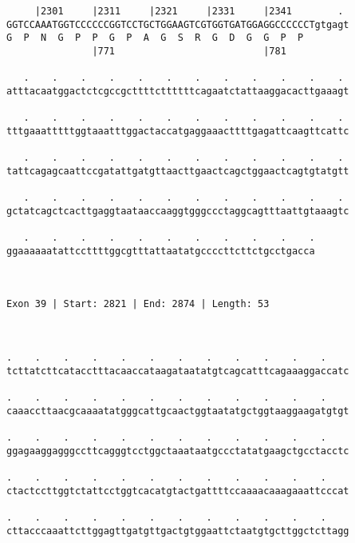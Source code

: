\documentclass{article}
\begin{document}
\begin{Verbatim}
     |2301     |2311     |2321     |2331     |2341        . 
GGTCCAAATGGTCCCCCCGGTCCTGCTGGAAGTCGTGGTGATGGAGGCCCCCCTgtgagt
G  P  N  G  P  P  G  P  A  G  S  R  G  D  G  G  P  P        
               |771                          |781           
  
   .    .    .    .    .    .    .    .    .    .    .    . 
atttacaatggactctcgccgcttttcttttttcagaatctattaaggacacttgaaagt
                                                            
   .    .    .    .    .    .    .    .    .    .    .    . 
tttgaaatttttggtaaatttggactaccatgaggaaacttttgagattcaagttcattc
                                                            
   .    .    .    .    .    .    .    .    .    .    .    . 
tattcagagcaattccgatattgatgttaacttgaactcagctggaactcagtgtatgtt
                                                            
   .    .    .    .    .    .    .    .    .    .    .    . 
gctatcagctcacttgaggtaataaccaaggtgggccctaggcagtttaattgtaaagtc
                                                            
   .    .    .    .    .    .    .    .    .    .    .
ggaaaaaatattccttttggcgtttattaatatgccccttcttctgcctgacca
                                                      
                                                      
 
Exon 39 | Start: 2821 | End: 2874 | Length: 53



.    .    .    .    .    .    .    .    .    .    .    .    
tcttatcttcatacctttacaaccataagataatatgtcagcatttcagaaaggaccatc
                                                            
.    .    .    .    .    .    .    .    .    .    .    .    
caaaccttaacgcaaaatatgggcattgcaactggtaatatgctggtaaggaagatgtgt
                                                            
.    .    .    .    .    .    .    .    .    .    .    .    
ggagaaggagggccttcagggtcctggctaaataatgccctatatgaagctgcctacctc
                                                            
.    .    .    .    .    .    .    .    .    .    .    .    
ctactccttggtctattcctggtcacatgtactgattttccaaaacaaagaaattcccat
                                                            
.    .    .    .    .    .    .    .    .    .    .    .    
cttacccaaattcttggagttgatgttgactgtggaattctaatgtgcttggctcttagg
                                                            

\end{Verbatim}
\end{document}

